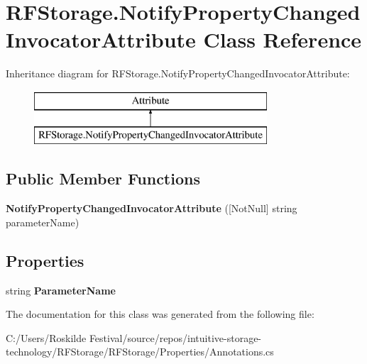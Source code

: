 \section{R\+F\+Storage.\+Notify\+Property\+Changed\+Invocator\+Attribute Class Reference}
\label{class_r_f_storage_1_1_notify_property_changed_invocator_attribute}
Inheritance diagram for R\+F\+Storage.\+Notify\+Property\+Changed\+Invocator\+Attribute\+:\begin{figure}[H]
\begin{center}
\leavevmode
\includegraphics[height=2.000000cm]{class_r_f_storage_1_1_notify_property_changed_invocator_attribute}
\end{center}
\end{figure}
\subsection*{Public Member Functions}
\begin{DoxyCompactItemize}
\item 
\mbox{\label{class_r_f_storage_1_1_notify_property_changed_invocator_attribute_ab6d50cfc50af809fa9eaaccece602bd9}} 
{\bfseries Notify\+Property\+Changed\+Invocator\+Attribute} ([Not\+Null] string parameter\+Name)
\end{DoxyCompactItemize}
\subsection*{Properties}
\begin{DoxyCompactItemize}
\item 
\mbox{\label{class_r_f_storage_1_1_notify_property_changed_invocator_attribute_a701794c4d67e925207809a976faf596c}} 
string {\bfseries Parameter\+Name}\hspace{0.3cm}{\ttfamily  [get]}
\end{DoxyCompactItemize}


The documentation for this class was generated from the following file\+:\begin{DoxyCompactItemize}
\item 
C\+:/\+Users/\+Roskilde Festival/source/repos/intuitive-\/storage-\/technology/\+R\+F\+Storage/\+R\+F\+Storage/\+Properties/Annotations.\+cs\end{DoxyCompactItemize}
